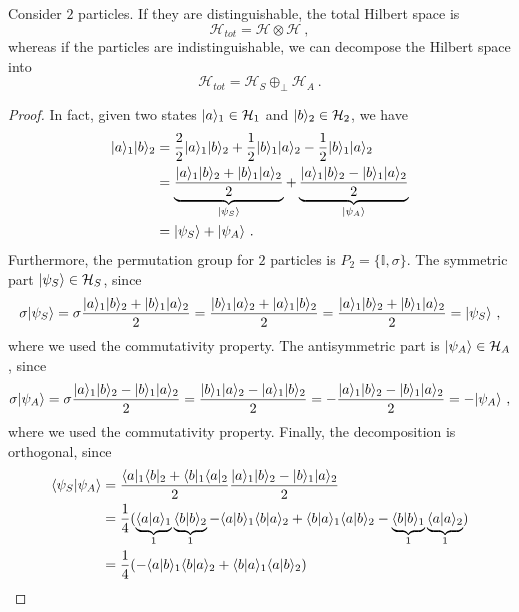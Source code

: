     Consider $2$ particles. If they are distinguishable, the total Hilbert space is 
    \begin{equation*}
        \mathcal H_{tot} = \mathcal H \otimes \mathcal H ~,
    \end{equation*}
    whereas if the particles are indistinguishable, we can decompose the Hilbert space into
    \begin{equation*}
        \mathcal H_{tot} = \mathcal H_S \oplus_\perp  \mathcal H_A ~.
    \end{equation*} 
    \begin{proof}
        In fact, given two states $\vert a\rangle_1 \in \mathcal H_1$ and $\vert b\rangle_2 \in \mathcal H_2$, we have 
    \begin{equation*}
    \begin{aligned}
        \vert a\rangle_1\vert b\rangle_2 & = \frac{2}{2} \vert a\rangle_1\vert b\rangle_2 + \frac{1}{2} \vert b\rangle_1\vert a\rangle_2 - \frac{1}{2} \vert b\rangle_1\vert a\rangle_2 \\ & = \underbrace{\frac{\vert a\rangle_1\vert b\rangle_2 + \vert b\rangle_1\vert a\rangle_2}{2}}_{\vert\psi_S\rangle} + \underbrace{\frac{\vert a\rangle_1\vert b\rangle_2 - \vert b\rangle_1\vert a\rangle_2}{2}}_{\vert\psi_A\rangle} \\ & = \vert\psi_S\rangle + \vert\psi_A\rangle ~.
    \end{aligned}
    \end{equation*}
    Furthermore, the permutation group for $2$ particles is $P_2 = \{\mathbb I, \sigma\}$. The symmetric part $\vert\psi_S\rangle \in \mathcal H_S$, since
    \begin{equation*}
        \sigma \vert\psi_S\rangle = \sigma \frac{\vert a\rangle_1\vert b\rangle_2 + \vert b\rangle_1\vert a\rangle_2}{2} = \frac{\vert b\rangle_1\vert a\rangle_2 + \vert a\rangle_1\vert b\rangle_2}{2} = \frac{\vert a\rangle_1\vert b\rangle_2 + \vert b\rangle_1\vert a\rangle_2}{2} = \vert\psi_S\rangle ~,
    \end{equation*}
    where we used the commutativity property. The antisymmetric part is $\vert\psi_A\rangle \in \mathcal H_A$, since
    \begin{equation*}
        \sigma \vert\psi_A\rangle = \sigma \frac{\vert a\rangle_1\vert b\rangle_2 - \vert b\rangle_1\vert a\rangle_2}{2} = \frac{\vert b\rangle_1\vert a\rangle_2 - \vert a\rangle_1\vert b\rangle_2}{2} = - \frac{\vert a\rangle_1\vert b\rangle_2 - \vert b\rangle_1\vert a\rangle_2}{2} = - \vert\psi_A\rangle ~,
    \end{equation*}
    where we used the commutativity property. Finally, the decomposition is orthogonal, since 
    \begin{equation*}
    \begin{aligned}
        \braket{\psi_S}{\psi_A} & = \frac{\bra{a}_1\bra{b}_2 + \bra{b}_1\bra{a}_2}{2} \frac{\ket{a}_1 \ket{b}_2 - \ket{b}_1 \ket{a}_2}{2} \\ & = \frac{1}{4} (\underbrace{\braket{a}{a}_1}_1 \underbrace{\braket{b}{b}_2}_1 - \braket{a}{b}_1 \braket{b}{a}_2 + \braket{b}{a}_1 \braket{a}{b}_2 - \underbrace{\braket{b}{b}_1}_1 \underbrace{\braket{a}{a}_2}_1) \\ & = \frac{1}{4} (- \braket{a}{b}_1 \braket{b}{a}_2 + \braket{b}{a}_1 \braket{a}{b}_2)  

\end{aligned}
\end{equation*}
\end{proof}
